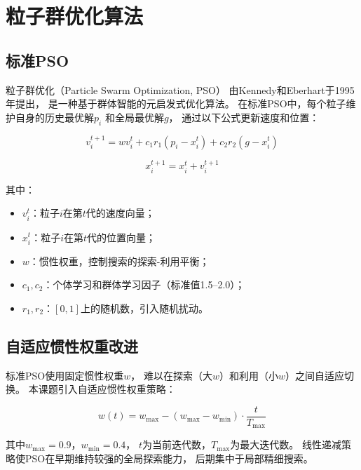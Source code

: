 \section{粒子群优化算法}

\subsection{标准PSO}

粒子群优化（Particle Swarm Optimization, PSO）
由Kennedy和Eberhart于1995年提出，
是一种基于群体智能的元启发式优化算法。
在标准PSO中，每个粒子维护自身的历史最优解$p_i$
和全局最优解$g$，
通过以下公式更新速度和位置：

\begin{equation}
    v_i^{t+1} = w v_i^t + c_1 r_1 (p_i - x_i^t) + c_2 r_2 (g - x_i^t)
    \label{eq:pso_velocity}
\end{equation}

\begin{equation}
    x_i^{t+1} = x_i^t + v_i^{t+1}
    \label{eq:pso_position}
\end{equation}

其中：
\begin{itemize}
    \item $v_i^t$：粒子$i$在第$t$代的速度向量；
    \item $x_i^t$：粒子$i$在第$t$代的位置向量；
    \item $w$：惯性权重，控制搜索的探索-利用平衡；
    \item $c_1, c_2$：个体学习和群体学习因子（标准值1.5--2.0）；
    \item $r_1, r_2$：$[0,1]$上的随机数，引入随机扰动。
\end{itemize}

\subsection{自适应惯性权重改进}

标准PSO使用固定惯性权重$w$，
难以在探索（大$w$）和利用（小$w$）之间自适应切换。
本课题引入自适应惯性权重策略：

\begin{equation}
    w(t) = w_{\text{max}} - (w_{\text{max}} - w_{\text{min}}) \cdot \frac{t}{T_{\text{max}}}
    \label{eq:adaptive_w}
\end{equation}

其中$w_{\text{max}} = 0.9$，$w_{\text{min}} = 0.4$，
$t$为当前迭代数，$T_{\text{max}}$为最大迭代数。
线性递减策略使PSO在早期维持较强的全局探索能力，
后期集中于局部精细搜索。

